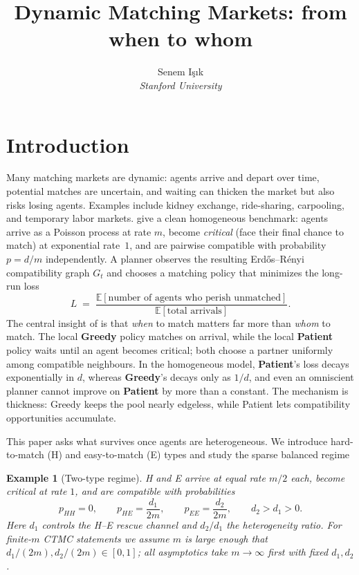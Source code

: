 \documentclass{article}
\title{Dynamic Matching Markets: from when to whom}
\author{Senem I\c{s}\i{}k \\ \textit{Stanford University}}
\theoremstyle{plain}
\newtheorem{example}{Example}
\theoremstyle{definition}
\newcommand{\E}{\mathbb{E}}
\begin{document}
\maketitle

\section{Introduction}

Many matching markets are dynamic: agents arrive and depart over time, potential matches are uncertain, and waiting can thicken the market but also risks losing agents. Examples include kidney exchange, ride-sharing, carpooling, and temporary labor markets. \cite{akbarpour} give a clean homogeneous benchmark: agents arrive as a Poisson process at rate $m$, become \emph{critical} (face their final chance to match) at exponential rate~$1$, and are pairwise compatible with probability $p=d/m$ independently. A planner observes the resulting Erd\H{o}s--R\'enyi compatibility graph $G_t$ and chooses a matching policy that minimizes the long-run loss
\[
L \;=\; \frac{\E[\text{number of agents who perish unmatched}]}{\E[\text{total arrivals}]}.
\]
The central insight of \cite{akbarpour} is that \emph{when} to match matters far more than \emph{whom} to match. The local \textbf{Greedy} policy matches on arrival, while the local \textbf{Patient} policy waits until an agent becomes critical; both choose a partner uniformly among compatible neighbours. In the homogeneous model, \textbf{Patient}'s loss decays exponentially in $d$, whereas \textbf{Greedy}'s decays only as $1/d$, and even an omniscient planner cannot improve on \textbf{Patient} by more than a constant. The mechanism is thickness: Greedy keeps the pool nearly edgeless, while Patient lets compatibility opportunities accumulate.

This paper asks what survives once agents are heterogeneous. We introduce hard-to-match (H) and easy-to-match (E) types and study the sparse balanced regime

\begin{example}[Two-type regime]\label{ex:regime}
H and E arrive at equal rate $m/2$ each, become critical at rate $1$, and are compatible with probabilities
\begin{equation}\label{eq:regime}
p_{HH}=0,\qquad p_{HE}=\frac{d_1}{2m},\qquad p_{EE}=\frac{d_2}{2m},\qquad d_2>d_1>0.
\end{equation}
Here $d_1$ controls the H--E rescue channel and $d_2/d_1$ the heterogeneity ratio. For finite-$m$ CTMC statements we assume $m$ is large enough that $d_1/(2m),d_2/(2m)\in[0,1]$; all asymptotics take $m\to\infty$ first with fixed $d_1,d_2$.
\end{example}
\end{document}
